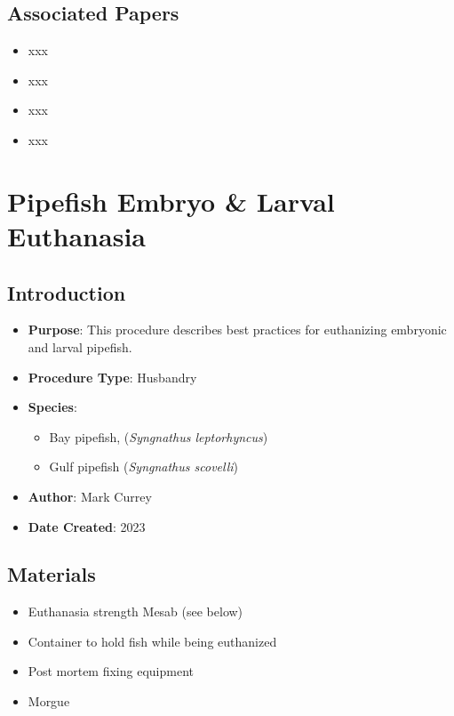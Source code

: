 \documentclass[
  letterpaper,
  DIV=11,
  numbers=noendperiod]{scrreprt}
\providecommand{\tightlist}{%
  \setlength{\itemsep}{0pt}\setlength{\parskip}{0pt}}\usepackage{longtable,booktabs,array}
\begin{document}
\hypertarget{associated-papers-25}{%
\section{Associated Papers}\label{associated-papers-25}}

\begin{itemize}
\tightlist
\item
  xxx
\item
  xxx
\item
  xxx
\item
  xxx
\end{itemize}

\hypertarget{sec-husbandry-pipefish_larval_euth}{%
\chapter{Pipefish Embryo \& Larval
Euthanasia}\label{sec-husbandry-pipefish_larval_euth}}

\hypertarget{introduction-39}{%
\section{Introduction}\label{introduction-39}}

\begin{itemize}
\tightlist
\item
  \textbf{Purpose}: This procedure describes best practices for
  euthanizing embryonic and larval pipefish.
\item
  \textbf{Procedure Type}: Husbandry
\item
  \textbf{Species}:

  \begin{itemize}
  \tightlist
  \item
    Bay pipefish, (\emph{Syngnathus leptorhyncus})
  \item
    Gulf pipefish (\emph{Syngnathus scovelli})
  \end{itemize}
\item
  \textbf{Author}: Mark Currey
\item
  \textbf{Date Created}: 2023
\end{itemize}

\hypertarget{materials-37}{%
\section{Materials}\label{materials-37}}

\begin{itemize}
\tightlist
\item
  Euthanasia strength Mesab (see below)
\item
  Container to hold fish while being euthanized
\item
  Post mortem fixing equipment
\item
  Morgue
\end{itemize}
\end{document}
